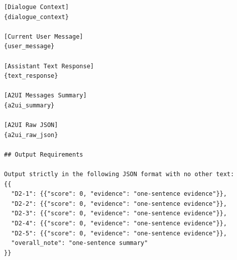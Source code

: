 \begin{verbatim}
[Dialogue Context]
{dialogue_context}

[Current User Message]
{user_message}

[Assistant Text Response]
{text_response}

[A2UI Messages Summary]
{a2ui_summary}

[A2UI Raw JSON]
{a2ui_raw_json}

## Output Requirements

Output strictly in the following JSON format with no other text:
{{
  "D2-1": {{"score": 0, "evidence": "one-sentence evidence"}},
  "D2-2": {{"score": 0, "evidence": "one-sentence evidence"}},
  "D2-3": {{"score": 0, "evidence": "one-sentence evidence"}},
  "D2-4": {{"score": 0, "evidence": "one-sentence evidence"}},
  "D2-5": {{"score": 0, "evidence": "one-sentence evidence"}},
  "overall_note": "one-sentence summary"
}}
\end{verbatim}

